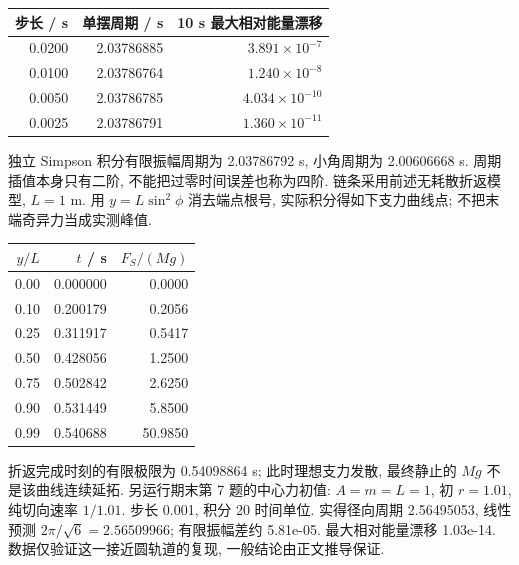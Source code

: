 \begin{center}\begin{tabular}{rrr}\toprule
步长 / s & 单摆周期 / s & 10 s 最大相对能量漂移 \\\midrule
0.0200 & 2.03786885 & $3.891\times10^{-7}$ \\
0.0100 & 2.03786764 & $1.240\times10^{-8}$ \\
0.0050 & 2.03786785 & $4.034\times10^{-10}$ \\
0.0025 & 2.03786791 & $1.360\times10^{-11}$ \\
\bottomrule\end{tabular}\end{center}
独立 Simpson 积分有限振幅周期为 2.03786792 s, 小角周期为 2.00606668 s. 周期插值本身只有二阶, 不能把过零时间误差也称为四阶.
链条采用前述无耗散折返模型, $L=1$ m. 用 $y=L\sin^2\phi$ 消去端点根号, 实际积分得如下支力曲线点; 不把末端奇异力当成实测峰值.
\begin{center}\begin{tabular}{rrr}\toprule
$y/L$ & $t$ / s & $F_S/(Mg)$ \\\midrule
0.00 & 0.000000 & 0.0000 \\
0.10 & 0.200179 & 0.2056 \\
0.25 & 0.311917 & 0.5417 \\
0.50 & 0.428056 & 1.2500 \\
0.75 & 0.502842 & 2.6250 \\
0.90 & 0.531449 & 5.8500 \\
0.99 & 0.540688 & 50.9850 \\
\bottomrule\end{tabular}\end{center}
折返完成时刻的有限极限为 0.54098864 s; 此时理想支力发散, 最终静止的 $Mg$ 不是该曲线连续延拓.
另运行期末第 7 题的中心力初值: $A=m=L=1$, 初 $r=1.01$, 纯切向速率 $1/1.01$. 步长 0.001, 积分 20 时间单位. 实得径向周期 2.56495053, 线性预测 $2\pi/\sqrt6=2.56509966$; 有限振幅差约 5.81e-05. 最大相对能量漂移 1.03e-14. 数据仅验证这一接近圆轨道的复现, 一般结论由正文推导保证.
